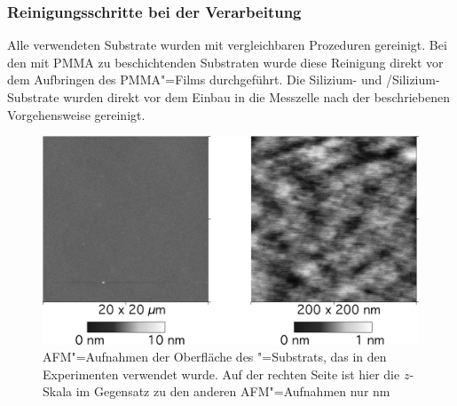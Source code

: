 \subsubsection{Reinigungsschritte bei der Verarbeitung}
Alle verwendeten Substrate wurden mit vergleichbaren Prozeduren gereinigt. Bei den mit PMMA zu beschichtenden Substraten wurde diese Reinigung direkt vor dem Aufbringen des PMMA"=Films durchgeführt. Die Silizium- und \SiO/Silizium-Substrate wurden direkt vor dem Einbau in die Messzelle nach der beschriebenen Vorgehensweise gereinigt.
\begin{figure}[h!tbp]
	\includegraphics{exp_substrate/SiO2_AFM}
	\begin{minipage}[b]{\linewidth-\tabcolsep-9.9cm}
	\caption[AFM"=Aufnahmen der Oberfläche des \SiO"=Substrats]{AFM"=Aufnahmen der Oberfläche des \SiO"=Substrats, das in den Experimenten verwendet wurde. Auf der rechten Seite ist hier die $z$-Skala im Gegensatz zu den anderen AFM"=Aufnahmen nur \unit[1]{nm}}
	\label{fig:afm_sio2}
	\end{minipage}
\end{figure}


